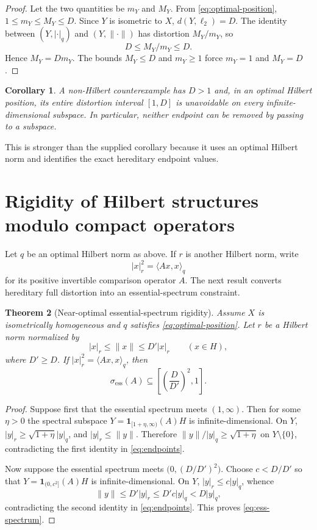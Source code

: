 \documentclass[11pt]{article}
\newtheorem{theorem}{Theorem}[section]
\newtheorem{corollary}[theorem]{Corollary}
\theoremstyle{definition}
\begin{document}
\begin{proof}
Let the two quantities be $m_Y$ and $M_Y$.  From
\eqref{eq:optimal-position}, $1\leq m_Y\leq M_Y\leq D$.  Since $Y$ is
isometric to $X$, $d(Y,\ell_2)=D$.  The identity between $(Y,|\cdot|_q)$ and
$(Y,\|\cdot\|)$ has distortion $M_Y/m_Y$, so
\[
 D\leq M_Y/m_Y\leq D.
\]
Hence $M_Y=Dm_Y$.  The bounds $M_Y\leq D$ and $m_Y\geq1$ force
$m_Y=1$ and $M_Y=D$.
\end{proof}

\begin{corollary}\label{cor:counter-distortion}
A non-Hilbert counterexample has $D>1$ and, in an optimal Hilbert position,
its entire distortion interval $[1,D]$ is unavoidable on every
infinite-dimensional subspace.  In particular, neither endpoint can be
removed by passing to a subspace.
\end{corollary}

This is stronger than the supplied corollary because it uses an optimal
Hilbert norm and identifies the exact hereditary endpoint values.

\section{Rigidity of Hilbert structures modulo compact operators}
\label{sec:compact}

Let $q$ be an optimal Hilbert norm as above.  If $r$ is another Hilbert norm,
write
\[
 |x|_r^2=\langle Ax,x\rangle_q
\]
for its positive invertible comparison operator $A$.  The next result converts
hereditary full distortion into an essential-spectrum constraint.

\begin{theorem}[Near-optimal essential-spectrum rigidity]\label{thm:ess-spectrum}
Assume $X$ is isometrically homogeneous and $q$ satisfies
\eqref{eq:optimal-position}.  Let $r$ be a Hilbert norm normalized by
\[
 |x|_r\leq\|x\|\leq D'|x|_r
 \qquad(x\in H),
\]
where $D'\geq D$.  If $|x|_r^2=\langle Ax,x\rangle_q$, then
\begin{equation}\label{eq:ess-spectrum}
 \sigma_{\mathrm{ess}}(A)\subseteq
 \left[\left(\frac{D}{D'}\right)^2,1\right].
\end{equation}
\end{theorem}

\begin{proof}
Suppose first that the essential spectrum meets $(1,\infty)$.  Then for some
$\eta>0$ the spectral subspace
$Y=\mathbf 1_{[1+\eta,\infty)}(A)H$ is infinite-dimensional.  On $Y$,
$|y|_r\geq\sqrt{1+\eta}|y|_q$, and $|y|_r\leq\|y\|$.  Therefore
$\|y\|/|y|_q\geq\sqrt{1+\eta}$ on $Y\setminus\{0\}$, contradicting the first
identity in \eqref{eq:endpoints}.

Now suppose the essential spectrum meets
$\bigl(0,(D/D')^2\bigr)$.  Choose $c<D/D'$ so that
$Y=\mathbf 1_{(0,c^2]}(A)H$ is infinite-dimensional.  On $Y$,
$|y|_r\leq c|y|_q$, whence
\[
 \|y\|\leq D'|y|_r\leq D'c|y|_q<D|y|_q,
\]
contradicting the second identity in \eqref{eq:endpoints}.  This proves
\eqref{eq:ess-spectrum}.
\end{proof}
\end{document}
